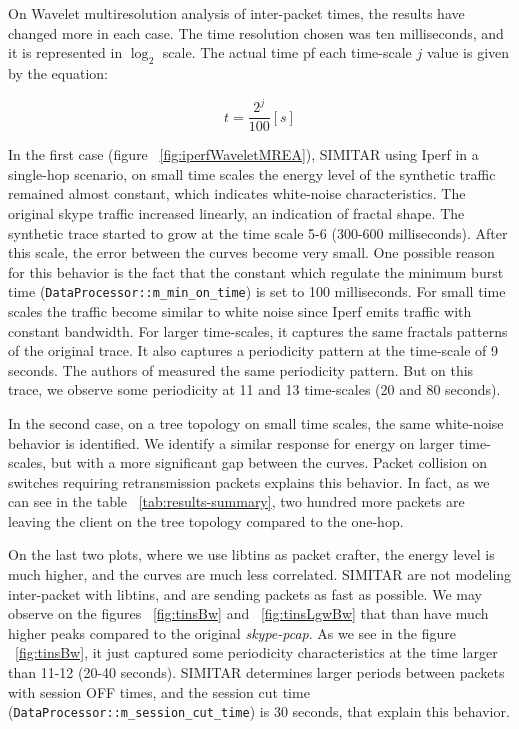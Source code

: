 On Wavelet multiresolution analysis of inter-packet times, the results have changed more in each case. The time resolution chosen was ten milliseconds, and it is represented in $\log_2$ scale. The actual time pf each time-scale $j$ value is given by the equation:

\begin{equation}
t = \frac{2^{j}}{100} [s]
\end{equation}

In the first case (figure ~\ref{fig:iperfWaveletMREA}), SIMITAR using Iperf in a single-hop scenario, on small time scales the energy level of the synthetic traffic remained almost constant, which indicates white-noise characteristics. The original skype traffic increased linearly, an indication of fractal shape. The synthetic trace started to grow at the time scale 5-6 (300-600 milliseconds). After this scale, the error between the curves become very small. One possible reason for this behavior is the fact that the constant which regulate the minimum burst time (\texttt{DataProcessor::m\_min\_on\_time}) is set to 100 milliseconds. For small time scales the traffic become similar to white noise since Iperf emits traffic with constant bandwidth. For larger time-scales, it captures the same fractals patterns of the original trace. It also captures a periodicity pattern at the time-scale of 9 seconds. The authors of \cite{swing-paper} measured the same periodicity pattern. But on this trace, we observe some periodicity at 11 and 13 time-scales (20 and 80 seconds). 

In the second case, on a tree topology on small time scales, the same white-noise behavior is identified. We identify a similar response for energy on larger time-scales, but with a more significant gap between the curves. Packet collision on switches requiring retransmission packets explains this behavior. In fact, as we can see in the table ~\ref{tab:results-summary}, two hundred more packets are leaving the client on the tree topology compared to the one-hop. 

On the last two plots, where we use libtins as packet crafter, the energy level is much higher, and the curves are much less correlated. SIMITAR are not modeling inter-packet with libtins, and are sending packets as fast as possible. We may observe on the figures ~\ref{fig:tinsBw} and ~\ref{fig:tinsLgwBw} that than have much  higher peaks compared to the original \textit{skype-pcap}.  As we see in the figure ~\ref{fig:tinsBw}, it just captured some periodicity characteristics at the time larger than 11-12 (20-40 seconds). SIMITAR determines larger periods between packets with session OFF times, and the session cut time (\texttt{DataProcessor::m\_session\_cut\_time}) is 30 seconds, that explain this behavior.


